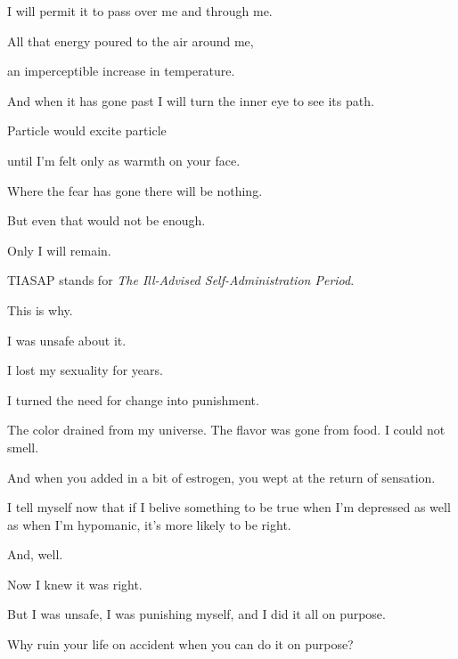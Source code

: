 \begin{ally}
I will permit it to pass over me and through me.
\end{ally}
All that energy poured to the air around me,

an imperceptible increase in temperature.

\begin{ally}
And when it has gone past I will turn the inner eye to see its path.
\end{ally}
Particle would excite particle

until I'm felt only as warmth on your face.

\begin{ally}
Where the fear has gone there will be nothing.
\end{ally}
But even that would not be enough.

\begin{ally}
Only I will remain.
\end{ally}
\newpage

\noindent TIASAP stands for \emph{The Ill-Advised Self-Administration Period}.

This is why.

I was unsafe about it.

I lost my sexuality for years.

I turned the need for change into punishment.

The color drained from my universe. The flavor was gone from food. I could not smell.

\begin{ally}
And when you added in a bit of estrogen, you wept at the return of sensation.
\end{ally}
I tell myself now that if I belive something to be true when I'm depressed as well as when I'm hypomanic, it's more likely to be right.

And, well.

Now I knew it was right.

But I was unsafe, I was punishing myself, and I did it all on purpose.

\begin{ally}
Why ruin your life on accident when you can do it on purpose?
\end{ally}
\newpage
